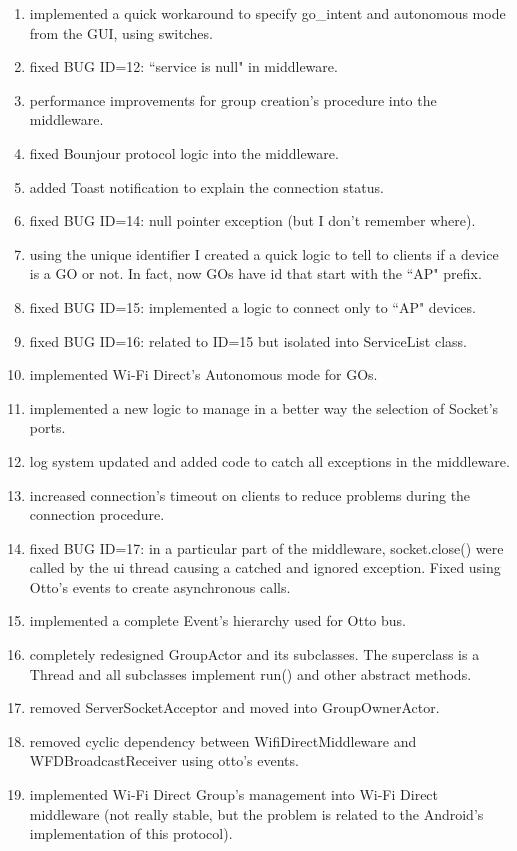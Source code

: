 \begin{enumerate}
	\item implemented a quick workaround to specify go\_intent and autonomous mode from the GUI, using switches.
	\item fixed BUG ID=12: ``service is null" in middleware.
	\item performance improvements for group creation's procedure into the middleware.
	\item fixed Bounjour protocol logic into the middleware.
	\item added Toast notification to explain the connection status.
	\item fixed BUG ID=14: null pointer exception (but I don't remember where).
	\item using the unique identifier I created a quick logic to tell to clients if a device is a GO or not. In fact, now GOs have id that start with the ``AP" prefix.
	\item fixed BUG ID=15: implemented a logic to connect only to ``AP" devices.
	\item fixed BUG ID=16: related to ID=15 but isolated into ServiceList class.
	\item implemented Wi-Fi Direct's Autonomous mode for GOs.
	\item implemented a new logic to manage in a better way the selection of Socket's ports.
	\item log system updated and added code to catch all exceptions in the middleware.
	\item increased connection's timeout on clients to reduce problems during the connection procedure.
	\item fixed BUG ID=17: in a particular part of the middleware, socket.close() were called by the ui thread causing a catched and ignored exception. Fixed using Otto's events to create asynchronous calls.
	\item implemented a complete Event's hierarchy used for Otto bus.
	\item completely redesigned GroupActor and its subclasses. The superclass is a Thread and all subclasses implement run() and other abstract methods.
	\item removed ServerSocketAcceptor and moved into GroupOwnerActor.
	\item removed cyclic dependency between WifiDirectMiddleware and WFDBroadcastReceiver using otto's events.
	\item implemented Wi-Fi Direct Group's management into Wi-Fi Direct middleware (not really stable, but the problem is related to the Android's implementation of this protocol).

\end{enumerate}
